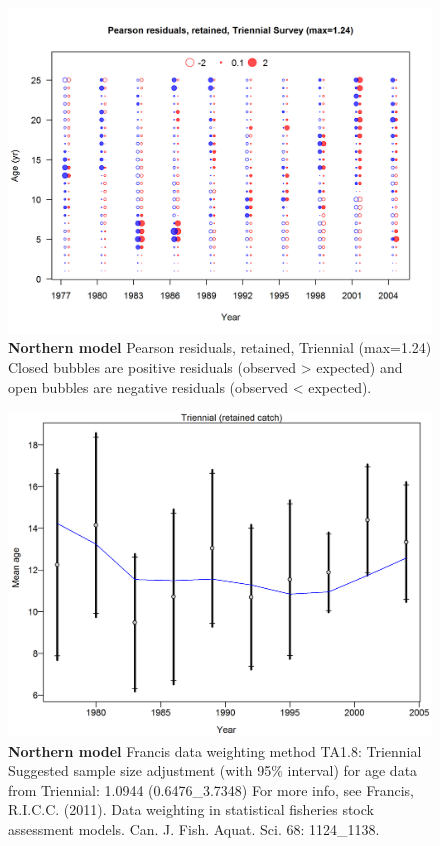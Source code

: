 \documentclass[12pt,]{article}
\begin{document}
\begin{figure}[htbp]
\centering
\includegraphics{./r4ss/plots_mod1/comp_agefit_residsflt5mkt2.png}
\caption{\textbf{Northern model} Pearson residuals, retained, Triennial
(max=1.24)\\
Closed bubbles are positive residuals (observed \textgreater{} expected)
and open bubbles are negative residuals (observed \textless{} expected).
\label{fig:mod1_11_comp_agefit_residsflt5mkt2}}
\end{figure}

\begin{figure}[htbp]
\centering
\includegraphics{./r4ss/plots_mod1/comp_agefit_data_weighting_TA1.8_Triennial.png}
\caption{\textbf{Northern model} Francis data weighting method TA1.8:
Triennial Suggested sample size adjustment (with 95\% interval) for age
data from Triennial: 1.0944 (0.6476\_3.7348) For more info, see Francis,
R.I.C.C. (2011). Data weighting in statistical fisheries stock
assessment models. Can. J. Fish. Aquat. Sci. 68: 1124\_1138.
\label{fig:mod1_13_comp_agefit_data_weighting_TA1.8_Triennial}}
\end{figure}
\end{document}

